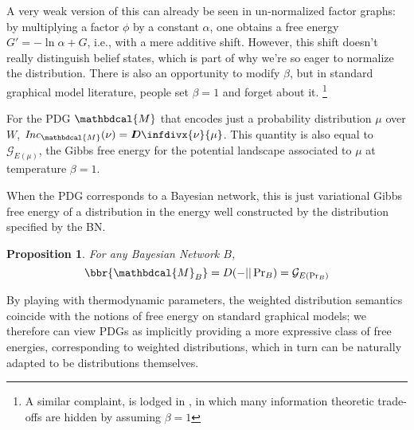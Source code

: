 \documentclass{article}
\theoremstyle{plain}
\newtheorem{prop}[theorem]{Proposition}
\theoremstyle{definition}
\theoremstyle{remark}
\newcommand{\thickD}{I\mkern-8muD}
\newcommand{\kldiv}{\thickD\infdivx}
\newcommand{\dg}[1]{\mathbdcal{#1}}
\newcommand\Inc{\mathit{Inc}}
\newcommand{\PDGof}[1]{{\dg M}_{#1}}
\numberwithin{equation}{section}
\begin{document}
A very weak version of this can already be seen in un-normalized factor graphs: by multiplying a factor $\phi$ by a constant $\alpha$, one obtains a free energy $G' = - \ln \alpha + G$, i.e., with a mere additive shift. However, this shift doesn't really distinguish belief states, which is part of why we're so eager to normalize the distribution.
There is also an opportunity to modify $\beta$, but in standard graphical model literature, people set $\beta = 1$ and forget about it.%
	\footnote{A similar complaint, is lodged in \cite{fixing-broken-elbo}, in which many information theoretic trade-offs are hidden by assuming $\beta = 1$}


\begin{example}%
	\label{ex:energy-from-distrib}
	For the PDG $\dg M$ that encodes just a probability
			distribution $\mu$ over $W$,  $\Inc_{\dg M}(\nu) = \kldiv{\nu}{\mu}$. This quantity is also equal to $\mathcal G_{E(\mu)}$, the Gibbs free energy for the potential landscape associated to $\mu$ at temperature $\beta = 1$.
\end{example}


When the PDG corresponds to a Bayesian network, this is just variational Gibbs free energy of a distribution in the energy well constructed by the distribution specified by the BN.

\begin{prop}\label{prop:bn-free-energy}
	For any Bayesian Network $B$, 
	\[ \bbr{\PDGof{B}} = D(- || \Pr\nolimits_B) = \mathcal G_{E(\Pr_B)} \]
\end{prop}

By playing with thermodynamic parameters, the weighted distribution semantics coincide with the notions of free energy on standard graphical models; we therefore can view PDGs as implicitly providing a more expressive class of free energies, corresponding to weighted distributions, which in turn can be naturally adapted to be distributions themselves.

\end{document}
